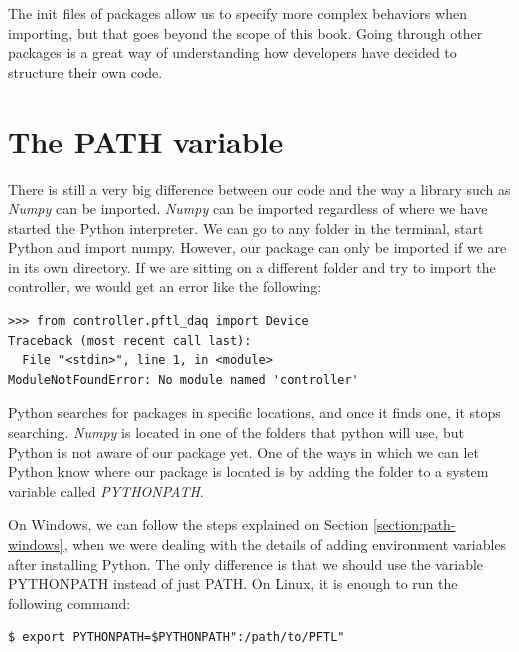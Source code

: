 
The init files of packages allow us to specify more complex behaviors when importing, but that goes beyond the scope of this book. Going through other packages is a great way of understanding how developers have decided to structure their own code. 

\section{The PATH variable}\label{section:path}
There is still a very big difference between our code and the way a library such as \emph{Numpy} can be imported. \emph{Numpy} can be imported regardless of where we have started the Python interpreter. We can go to any folder in the terminal, start Python and import numpy. However, our package can only be imported if we are in its own directory. If we are sitting on a different folder and try to import the controller, we would get an error like the following:

\begin{verbatim}
>>> from controller.pftl_daq import Device
Traceback (most recent call last):
  File "<stdin>", line 1, in <module>
ModuleNotFoundError: No module named 'controller'
\end{verbatim}

Python searches for packages in specific locations, and once it finds one, it stops searching. \emph{Numpy} is located in one of the folders that python will use, but Python is not aware of our package yet. One of the ways in which we can let Python know where our package is located is by adding the folder to a system variable called \emph{PYTHONPATH}.

On Windows, we can follow the steps explained on Section \ref{section:path-windows}, when we were dealing with the details of adding environment variables after installing Python. The only difference is that we should use the variable PYTHONPATH instead of just PATH. On Linux, it is enough to run the following command:

\begin{verbatim}
$ export PYTHONPATH=$PYTHONPATH":/path/to/PFTL"
\end{verbatim}

